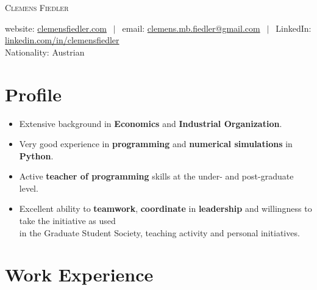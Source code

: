 \documentclass[a4paper,8pt]{article}
\begin{document}
\thispagestyle{empty}




\textsc{\Huge Clemens Fiedler}

website: \href{https://clemensfiedler.com/}{clemensfiedler.com} $~~\vert~~$ 
email: \href{mailto:clemens.mb.fiedler@gmail.com}{clemens.mb.fiedler@gmail.com} $~~\vert~~$ 
LinkedIn: \href{www.linkedin.com/in/clemensfiedler}{linkedin.com/in/clemensfiedler}\\
Nationality: Austrian

\section{Profile}

\begin{itemize}[noitemsep]
	\item Extensive background in \textbf{Economics} and \textbf{Industrial Organization}.
	\item Very good experience in \textbf{programming} and \textbf{numerical simulations} in \textbf{Python}.
	\item Active \textbf{teacher of programming} skills at the under- and post-graduate level.
	\item Excellent ability to \textbf{teamwork}, \textbf{coordinate} in \textbf{leadership} and willingness to take the initiative as used\\ in the Graduate Student Society, teaching activity and personal initiatives.
\end{itemize}

\section{Work Experience}
\end{document}
